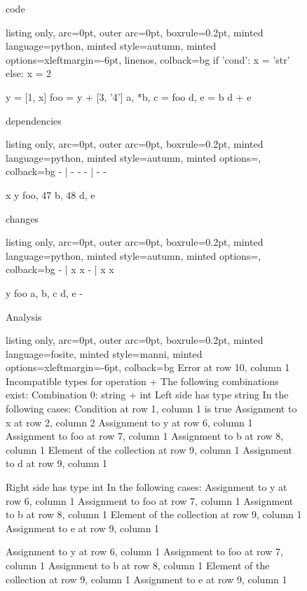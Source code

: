 \begin{figure}[!h]
 \begin{minipage}{0.32\textwidth}
 code
 \vspace{2pt}
  \begin{tcblisting}{listing only, 
    arc=0pt,
    outer arc=0pt, 
    boxrule=0.2pt,
    minted language=python,
    minted style=autumn,
    minted options={xleftmargin=-6pt, linenos},
    colback=bg }
if 'cond':
  x = 'str'
else:
  x = 2

y = [1, x]
foo = y + [3, '4']
a, *b, c = foo 
d, e = b
d + e
\end{tcblisting}
 \end{minipage}
 \begin{minipage}{0.32\textwidth}
 dependencies
  \begin{tcblisting}{listing only, 
    arc=0pt,
    outer arc=0pt, 
    boxrule=0.2pt,
    minted language=python,
    minted style=autumn,
    minted options={},
    colback=bg }
- | -
    -
- | -
    -

x
y
foo, 47 
b, 48
d, e
\end{tcblisting}
 \end{minipage}
 \begin{minipage}{0.32\textwidth}
 changes
  \begin{tcblisting}{listing only, 
    arc=0pt,
    outer arc=0pt, 
    boxrule=0.2pt,
    minted language=python,
    minted style=autumn,
    minted options={},
    colback=bg }
- | x
    x
- | x
    x

y
foo
a, b, c
d, e
-
\end{tcblisting}
 \end{minipage}
 \begin{minipage}{\textwidth}
  \vspace{4pt}
  Analysis
  \begin{tcblisting}{listing only, 
    arc=0pt,
    outer arc=0pt, 
    boxrule=0.2pt,
    minted language=fosite,
    minted style=manni,
    minted options={xleftmargin=-6pt},
    colback=bg }
Error at row 10, column 1
  Incompatible types for operation +
  The following combinations exist:
  Combination 0: string + int
    Left side has type string
    In the following cases:
      Condition at row 1, column 1 is true
      Assignment to x at row 2, column 2
      Assignment to y at row 6, column 1
      Assignment to foo at row 7, column 1
      Assignment to b at row 8, column 1
      Element of the collection at row 9, column 1
      Assignment to d at row 9, column 1

    Right side has type int
    In the following cases:
      Assignment to y at row 6, column 1
      Assignment to foo at row 7, column 1
      Assignment to b at row 8, column 1
      Element of the collection at row 9, column 1
      Assignment to e at row 9, column 1

      Assignment to y at row 6, column 1
      Assignment to foo at row 7, column 1
      Assignment to b at row 8, column 1
      Element of the collection at row 9, column 1
      Assignment to e at row 9, column 1
\end{tcblisting}
 \end{minipage}
 \label{lst:unpacking}
\end{figure}